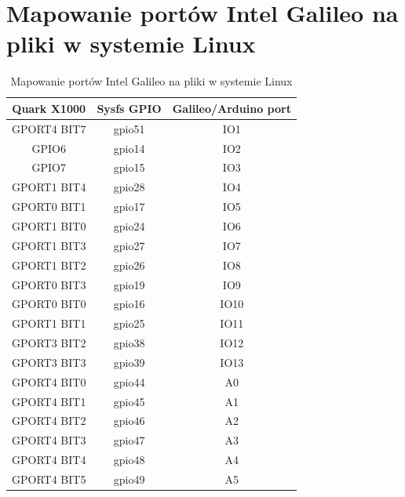 \documentclass{xmgr}
\begin{document}
\chapter{Mapowanie portów Intel Galileo na pliki w systemie Linux}
\begin{table}[!hp]
\begin{tabular}{|c|c|c|} \hline
\textbf{Quark X1000} & \textbf{Sysfs GPIO} & \textbf{Galileo/Arduino port} \\ \hline
GPORT4 BIT7 & gpio51 & IO1 \\ \hline
GPIO6 & gpio14 & IO2 \\ \hline
GPIO7 & gpio15 & IO3 \\ \hline
GPORT1 BIT4 & gpio28 & IO4 \\ \hline
GPORT0 BIT1 & gpio17 & IO5 \\ \hline
GPORT1 BIT0 & gpio24 & IO6 \\ \hline
GPORT1 BIT3 & gpio27 & IO7 \\ \hline
GPORT1 BIT2 & gpio26 & IO8 \\ \hline
GPORT0 BIT3 & gpio19 & IO9 \\ \hline
GPORT0 BIT0 & gpio16 & IO10 \\ \hline
GPORT1 BIT1 & gpio25 & IO11 \\ \hline
GPORT3 BIT2 & gpio38 & IO12 \\ \hline
GPORT3 BIT3 & gpio39 & IO13 \\ \hline
GPORT4 BIT0 & gpio44 & A0 \\ \hline
GPORT4 BIT1 & gpio45 & A1 \\ \hline
GPORT4 BIT2 & gpio46 & A2 \\ \hline
GPORT4 BIT3 & gpio47 & A3 \\ \hline
GPORT4 BIT4 & gpio48 & A4 \\ \hline
GPORT4 BIT5 & gpio49 & A5 \\ \hline
\end{tabular}
\caption{Mapowanie portów Intel Galileo na pliki w systemie Linux}
\end{table}
\end{document}
